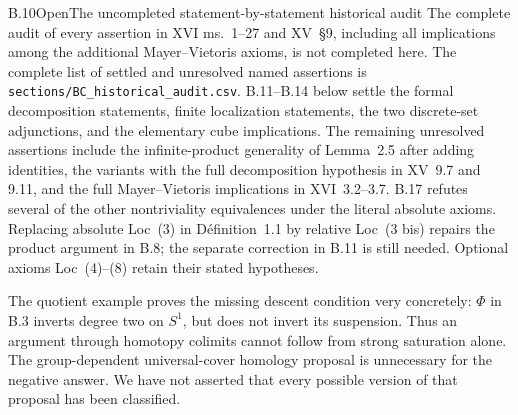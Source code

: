 \begin{claim}{B.10}{Open}{The uncompleted statement-by-statement historical audit}
The complete audit of every assertion in XVI ms.~1--27 and XV~\S9,
including all implications among the additional Mayer--Vietoris axioms,
is not completed here. The complete list of settled and unresolved
named assertions is \texttt{sections/BC\_historical\_audit.csv}.
B.11--B.14 below settle the formal decomposition statements, finite
localization statements, the two discrete-set adjunctions, and the
elementary cube implications. The remaining unresolved assertions
include the infinite-product generality of Lemma~2.5 after adding
identities, the variants with the full decomposition hypothesis in
XV~9.7 and 9.11, and the full Mayer--Vietoris implications in
XVI~3.2--3.7. B.17 refutes several of the other nontriviality
equivalences under the literal absolute axioms. Replacing absolute
Loc~(3) in D\'efinition~1.1 by relative Loc~(3 bis) repairs the product
argument in B.8; the separate correction in B.11 is still needed.
Optional axioms Loc~(4)--(8) retain their stated hypotheses.
\end{claim}
The quotient example proves the missing descent condition very concretely:
$\Phi$ in B.3 inverts degree two on $S^1$, but does not invert its
suspension. Thus an argument through homotopy colimits cannot follow
from strong saturation alone. The group-dependent universal-cover
homology proposal is unnecessary for the negative answer. We have not
asserted that every possible version of that proposal has been classified.

